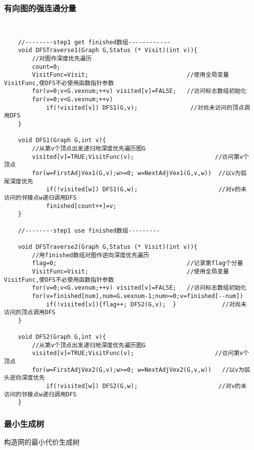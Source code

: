 \documentclass[UTF8]{ctexart}
\begin{document}
\subsubsection{有向图的强连通分量}

\begin{lstlisting}[style=v1] 


    //--------step1 get finished数组------------
    void DFSTraverse1(Graph G,Status (* Visit)(int v)){
        //对图作深度优先遍历
        count=0;
        VisitFunc=Visit;                            //使用全局变量VisitFunc,使DFS不必使用函数指针参数
        for(v=0;v<G.vexnum;++v) visited[v]=FALSE;   //访问标志数组初始化
        for(v=0;v<G.vexnum;++v) 
            if(!visited[v]) DFS1(G,v);               //对尚未访问的顶点调用DFS
    }

    void DFS1(Graph G,int v){
        //从第v个顶点出发递归地深度优先遍历图G
        visited[v]=TRUE;VisitFunc(v);                       //访问第v个顶点
        for(w=FirstAdjVex1(G,v);w>=0; w=NextAdjVex1(G,v,w))  //以v为弧尾深度优先
            if(!visited[w]) DFS1(G,w);                       //对v的未访问的邻接点w递归调用DFS
            finished[count++]=v;
    }

    //--------step1 use finished数组---------

    void DFSTraverse2(Graph G,Status (* Visit)(int v)){
        //用finished数组对图作逆向深度优先遍历
        flag=0;                                     //记录第flag个分量
        VisitFunc=Visit;                            //使用全局变量VisitFunc,使DFS不必使用函数指针参数
        for(v=0;v<G.vexnum;++v) visited[v]=FALSE;   //访问标志数组初始化
        for(v=finished[num],num=G.vexnum-1;num>=0;v=finished[--num]) 
            if(!visited[v]){flag++; DFS2(G,v);  }             //对尚未访问的顶点调用DFS
    }

    void DFS2(Graph G,int v){
        //从第v个顶点出发递归地深度优先遍历图G
        visited[v]=TRUE;VisitFunc(v);                       //访问第v个顶点
        for(w=FirstAdjVex2(G,v);w>=0; w=NextAdjVex2(G,v,w))   //以v为弧头逆向深度优先    
            if(!visited[w]) DFS2(G,w);                       //对v的未访问的邻接点w递归调用DFS
    }

\end{lstlisting}


\subsubsection{最小生成树}

构造网的最小代价生成树
\end{document}
